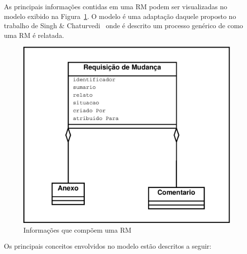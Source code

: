 As principais informações contidas em uma RM podem ser visualizadas no modelo
exibido na Figura~\ref{fig:diagrama-classe-atributos-requisicao-mudancas}. O
modelo é uma adaptação daquele proposto no trabalho de Singh \&
Chaturvedi~\cite{singh2011bug} onde é descrito um processo genérico de como uma
RM é relatada.

\begin{figure}[htpb]
	\centering
	\includegraphics[width=0.8\linewidth]{./chapter-manutencao-software-visao-geral/img/diagrama-classe-atributos-requisicao-mudancas.pdf}
	\caption{Informações que compõem uma RM}
\label{fig:diagrama-classe-atributos-requisicao-mudancas}
\end{figure}

Os principais conceitos envolvidos no modelo estão descritos a seguir:


